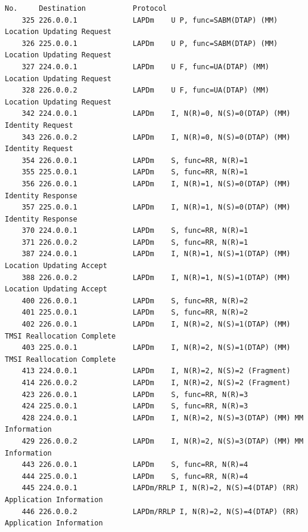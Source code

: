 \begin{lstlisting}[caption={[Erfolgreicher MitM-Angriff auf virtuellem Um, detailliert]Erfolgreicher \ac{MitM}-Angriff auf virtuellem \ac{Um}, detailliert (mit \ac{LAPDm}-Kontrollnachrichten), generiert mit Filtern aus Wireshark-Mitschnitt}, label={lst:mitm_attack_wireshark}, boxpos=c, frame=single, language=bytetxt, numbers=none, basicstyle=\tiny\ttfamily, tabsize=1 ]
No.     Destination           Protocol 
    325 226.0.0.1             LAPDm    U P, func=SABM(DTAP) (MM) Location Updating Request 
    326 225.0.0.1             LAPDm    U P, func=SABM(DTAP) (MM) Location Updating Request 
    327 224.0.0.1             LAPDm    U F, func=UA(DTAP) (MM) Location Updating Request 
    328 226.0.0.2             LAPDm    U F, func=UA(DTAP) (MM) Location Updating Request 
    342 224.0.0.1             LAPDm    I, N(R)=0, N(S)=0(DTAP) (MM) Identity Request 
    343 226.0.0.2             LAPDm    I, N(R)=0, N(S)=0(DTAP) (MM) Identity Request 
    354 226.0.0.1             LAPDm    S, func=RR, N(R)=1
    355 225.0.0.1             LAPDm    S, func=RR, N(R)=1
    356 226.0.0.1             LAPDm    I, N(R)=1, N(S)=0(DTAP) (MM) Identity Response 
    357 225.0.0.1             LAPDm    I, N(R)=1, N(S)=0(DTAP) (MM) Identity Response 
    370 224.0.0.1             LAPDm    S, func=RR, N(R)=1
    371 226.0.0.2             LAPDm    S, func=RR, N(R)=1
    387 224.0.0.1             LAPDm    I, N(R)=1, N(S)=1(DTAP) (MM) Location Updating Accept 
    388 226.0.0.2             LAPDm    I, N(R)=1, N(S)=1(DTAP) (MM) Location Updating Accept 
    400 226.0.0.1             LAPDm    S, func=RR, N(R)=2
    401 225.0.0.1             LAPDm    S, func=RR, N(R)=2
    402 226.0.0.1             LAPDm    I, N(R)=2, N(S)=1(DTAP) (MM) TMSI Reallocation Complete 
    403 225.0.0.1             LAPDm    I, N(R)=2, N(S)=1(DTAP) (MM) TMSI Reallocation Complete 
    413 224.0.0.1             LAPDm    I, N(R)=2, N(S)=2 (Fragment)
    414 226.0.0.2             LAPDm    I, N(R)=2, N(S)=2 (Fragment)
    423 226.0.0.1             LAPDm    S, func=RR, N(R)=3
    424 225.0.0.1             LAPDm    S, func=RR, N(R)=3
    428 224.0.0.1             LAPDm    I, N(R)=2, N(S)=3(DTAP) (MM) MM Information 
    429 226.0.0.2             LAPDm    I, N(R)=2, N(S)=3(DTAP) (MM) MM Information 
    443 226.0.0.1             LAPDm    S, func=RR, N(R)=4
    444 225.0.0.1             LAPDm    S, func=RR, N(R)=4
    445 224.0.0.1             LAPDm/RRLP I, N(R)=2, N(S)=4(DTAP) (RR) Application Information 
    446 226.0.0.2             LAPDm/RRLP I, N(R)=2, N(S)=4(DTAP) (RR) Application Information 

\end{lstlisting}
